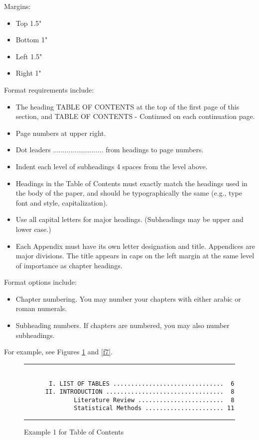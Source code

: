 \documentclass[draft]{ua-thesis}
\begin{document}
Margins:
\begin{itemize}
   \item Top 1.5"
   \item Bottom 1"
   \item Left 1.5"
   \item Right 1"
\end{itemize}
Format requirements include:
\begin{itemize}
   \item The heading TABLE OF CONTENTS at the top of the first page of this
     section, and TABLE OF CONTENTS - Continued on each continuation page.
   \item Page numbers at upper right.
   \item Dot leaders .......................... from headings to page numbers.
   \item Indent each level of subheadings 4 spaces from the level above.
   \item Headings in the Table of Contents must exactly match the headings used
     in the body of the paper, and should be typographically the same (e.g.,
     type font and style, capitalization).
   \item Use all capital letters for major headings. (Subheadings may be upper
     and lower case.)
   \item Each Appendix must have its own letter designation and title.
     Appendices are major divisions. The title appears in caps on the left
     margin at the same level of importance as chapter headings.
\end{itemize}
Format options include:
\begin{itemize}
   \item Chapter numbering. You may number your chapters with either arabic or
     roman numerals.
   \item Subheading numbers. If chapters are numbered, you may also number
     subheadings.
\end{itemize}
For example, see Figures \ref{f6} and \ref{f7}.

\begin{figure}
\hrule
\begin{verbatim}

       I. LIST OF TABLES ...............................  6
      II. INTRODUCTION .................................  8
              Literature Review ........................  8
              Statistical Methods ...................... 11

\end{verbatim}
\hrule
\caption{Example 1 for Table of Contents} \label{f6}
\end{figure}
\end{document}
